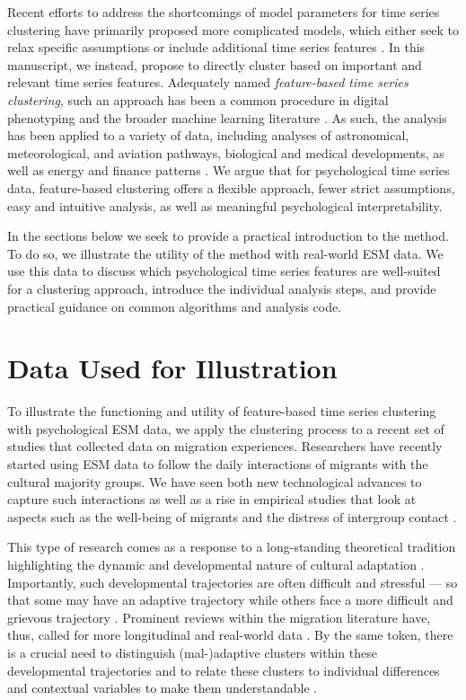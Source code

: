 \documentclass[man, 12pt, a4paper, floatsintext]{apa7}
\theoremstyle{break}
\theoremstyle{plain}
\begin{document}
Recent efforts to address the shortcomings of model parameters for time series clustering have primarily proposed more complicated models, which either seek to relax specific assumptions \citep[e.g.,][]{denteuling2021} or include additional time series features \citep[e.g., see][]{krone2018, gates2017}. In this manuscript, we instead, propose to directly cluster based on important and relevant time series features. Adequately named \textit{feature-based time series clustering}, such an approach has been a common procedure in digital phenotyping \citep[][]{loftus2022} and the broader machine learning literature \citep[][]{maharaj2019}. As such, the analysis has been applied to a variety of data, including analyses of astronomical, meteorological, and aviation pathways, biological and medical developments, as well as energy and finance patterns \citep{Aghabozorgi2015}. We argue that for psychological time series data, feature-based clustering offers a flexible approach, fewer strict assumptions, easy and intuitive analysis, as well as meaningful psychological interpretability. 

In the sections below we seek to provide a practical introduction to the method. To do so, we illustrate the utility of the method with real-world ESM data. We use this data to discuss which psychological time series features are well-suited for a clustering approach, introduce the individual analysis steps, and provide practical guidance on common algorithms and analysis code.

\section{Data Used for Illustration}

To illustrate the functioning and utility of feature-based time series clustering with psychological ESM data, we apply the clustering process to a recent set of studies that collected data on migration experiences. Researchers have recently started using ESM data to follow the daily interactions of migrants with the cultural majority groups. We have seen both new technological advances to capture such interactions \citep[e.g.,][]{Keil2020} as well as a rise in empirical studies that look at aspects such as the well-being of migrants \citep[e.g.,][]{hendriks2016} and the distress of intergroup contact \citep[e.g.,][]{doucerain2023}. 

This type of research comes as a response to a long-standing theoretical tradition highlighting the dynamic and developmental nature of cultural adaptation \citep[e.g.,][]{berry1986}. Importantly, such developmental trajectories are often difficult and stressful \citep{Ward2016} --- so that some may have an adaptive trajectory while others face a more difficult and grievous trajectory \citep{kim2017}. Prominent reviews within the migration literature have, thus, called for more longitudinal \citep[e.g.,][]{Ward2019} and real-world data \citep[e.g.,][]{McKeown2017}. By the same token, there is a crucial need to distinguish (mal-)adaptive clusters within these developmental trajectories and to relate these clusters to individual differences and contextual variables to make them understandable \citep[e.g.,][]{choi2009}. 
\end{document}

